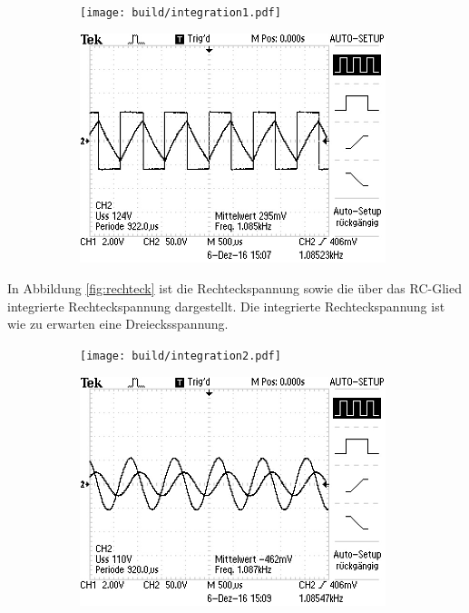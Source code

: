 \begin{figure}
	\caption{Aufgabenteil d: Rechteckspannung}
	\label{fig:rechteck}
	\centering
	\begin{subfigure}{0.48\textwidth}
		\centering
		\texttt{[image: build/integration1.pdf]}
		\label{fig:intrechteck}
	\end{subfigure}
	\begin{subfigure}{0.48\textwidth}
		\centering
		\includegraphics[width=0.98\textwidth]{bilder/ALL0001/F0001TEK.JPG}
		\label{fig:rorig}
	\end{subfigure}
\end{figure}
In Abbildung \ref{fig:rechteck} ist die Rechteckspannung sowie die über das RC-Glied integrierte Rechteckspannung dargestellt.
Die integrierte Rechteckspannung ist wie zu erwarten eine Dreiecksspannung.
\begin{figure}
	\caption{Aufgabenteil d: Sinusspannung}
	\label{fig:sinus}
	\centering
	\begin{subfigure}{0.48\textwidth}
		\centering
		\texttt{[image: build/integration2.pdf]}
		\label{fig:intsinus}
	\end{subfigure}
	\begin{subfigure}{0.48\textwidth}
		\centering
		\includegraphics[width=0.98\textwidth]{bilder/ALL0002/F0002TEK.JPG}
		\label{fig:sorig}
	\end{subfigure}
\end{figure}

